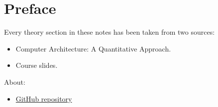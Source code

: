 \section*{Preface}

Every theory section in these notes has been taken from two sources:
\begin{itemize}
    \item Computer Architecture: A Quantitative Approach.\cite{hennessy2017computer}
    \item Course slides.\cite{pipelining-slides}
\end{itemize}
About:
\begin{itemize}
    \item[\faIcon{github}] \href{https://github.com/AndreVale69/HPC-E-PoliMI-university-notes}{GitHub repository}
\end{itemize}